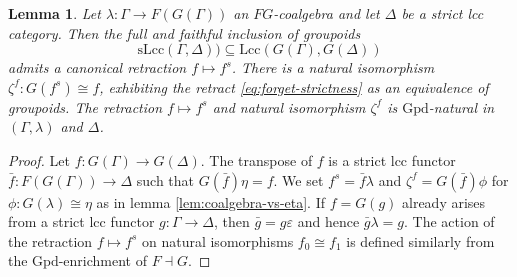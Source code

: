 \documentclass[a4paper]{article}
\newtheorem{lemma}[theorem]{Lemma}
\theoremstyle{remark}
\theoremstyle{definition}
\begin{document}
\begin{lemma}
  \label{lem:strictification}
  Let $\lambda : \Gamma \rightarrow F(G(\Gamma))$ an $FG$-coalgebra and let $\Delta$ be a strict lcc category.
  Then the full and faithful inclusion of groupoids
  \begin{equation}
    \label{eq:forget-strictness}
    \mathrm{sLcc}(\Gamma, \Delta)) \subseteq \mathrm{Lcc}(G(\Gamma), G(\Delta))
  \end{equation}
  admits a canonical retraction $f \mapsto f^s$.
  There is a natural isomorphism $\zeta^f : G(f^s) \cong f$, exhibiting the retract \eqref{eq:forget-strictness} as an equivalence of groupoids.
  The retraction $f \mapsto f^s$ and natural isomorphism $\zeta^f$ is $\mathrm{Gpd}$-natural in $(\Gamma, \lambda)$ and $\Delta$.
\end{lemma}
\begin{proof}
  Let $f : G(\Gamma) \rightarrow G(\Delta)$.
  The transpose of $f$ is a strict lcc functor $\bar f : F(G(\Gamma)) \rightarrow \Delta$ such that $G(\bar f) \eta = f$.
  We set $f^s = \bar f \lambda$ and $\zeta^f = G(\bar f) \phi$ for $\phi : G(\lambda) \cong \eta$ as in lemma \ref{lem:coalgebra-vs-eta}.
  If $f = G(g)$ already arises from a strict lcc functor $g : \Gamma \rightarrow \Delta$, then $\bar g = g \varepsilon$ and hence $\bar g \lambda = g$.
  The action of the retraction $f \mapsto f^s$ on natural isomorphisms $f_0 \cong f_1$ is defined similarly from the $\mathrm{Gpd}$-enrichment of $F \dashv G$.
\end{proof}
\end{document}

